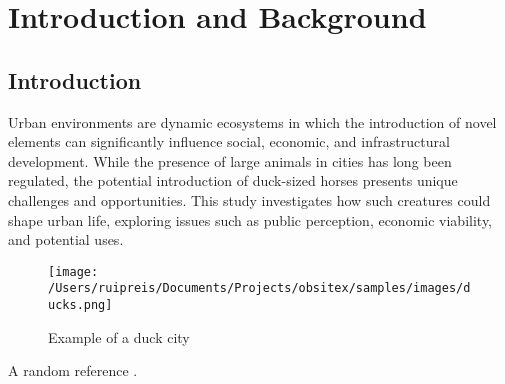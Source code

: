 \documentclass[12pt,a4paper]{report}
\author{Your Name Here}
\begin{document}
\setlength{\parindent}{0em}




\setlength{\parskip}{0pt}
\setlength{\parindent}{1.5em}






\tableofcontents

\cleardoublepage
\listoffigures

\renewcommand*{\listtablename}{List of Tables}
\listoftables
\clearpage

\printglossary[type=\acronymtype,nonumberlist, title={Acronyms}]

\printglossary[title={Glossary}, nonumberlist]

\cleardoublepage
{}

\part{Introduction and Background}\label{sec:Introduction_and_Background}

\chapter{Introduction}\label{sec:Introduction}

Urban environments are dynamic ecosystems in which the introduction of novel elements can significantly influence social, economic, and infrastructural development. While the presence of large animals in cities has long been regulated, the potential introduction of duck-sized horses presents unique challenges and opportunities. This study investigates how such creatures could shape urban life, exploring issues such as public perception, economic viability, and potential uses.



\begin{figure}[H]
\centering
\texttt{[image: /Users/ruipreis/Documents/Projects/obsitex/samples/images/ducks.png]}
\caption{Example of a duck city}
\end{figure}


A random reference \citep{weiFinetunedLanguageModels2022}.
\end{document}
